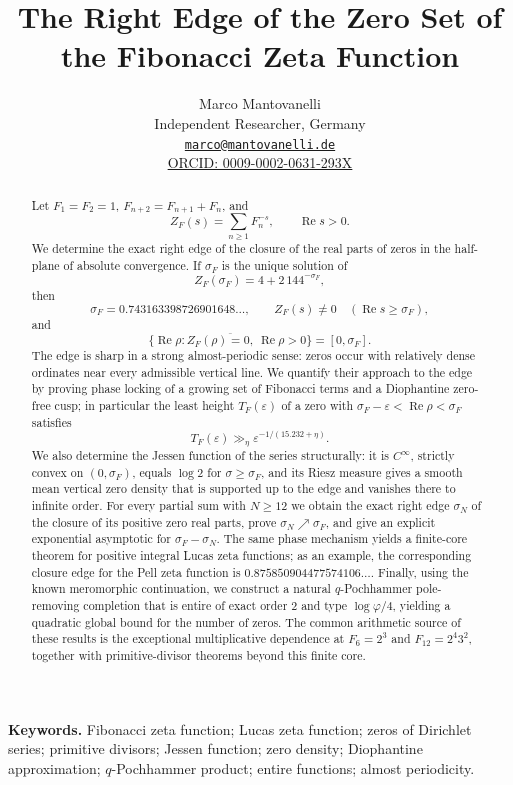 \documentclass[11pt]{article}
\title{\bfseries The Right Edge of the Zero Set of the Fibonacci Zeta Function}
\author{Marco Mantovanelli\\[2pt]
\small Independent Researcher, Germany\\[1pt]
\small \href{mailto:marco@mantovanelli.de}{\texttt{marco@mantovanelli.de}}\\[1pt]
\small \href{https://orcid.org/0009-0002-0631-293X}{ORCID: 0009-0002-0631-293X}}
\date{}
\theoremstyle{remark}
\newcommand{\ZF}{Z_F}
\newcommand{\Ree}{\operatorname{Re}}
\begin{document}
\maketitle

\begin{abstract}
Let $F_1=F_2=1$, $F_{n+2}=F_{n+1}+F_n$, and
\[
\ZF(s)=\sum_{n\ge 1}F_n^{-s},\qquad \Ree s>0.
\]
We determine the exact right edge of the closure of the real parts of zeros in the half-plane of absolute convergence.  If $\sigma_F$ is the unique solution of
\[
\ZF(\sigma_F)=4+2\,144^{-\sigma_F},
\]
then
\[
\sigma_F=0.743163398726901648\ldots,
\qquad
\ZF(s)\neq0\quad(\Ree s\ge\sigma_F),
\]
and
\[
\overline{\{\Ree\rho:\ZF(\rho)=0,\ \Ree\rho>0\}}=[0,\sigma_F].
\]
The edge is sharp in a strong almost-periodic sense: zeros occur with relatively dense ordinates near every admissible vertical line.  We quantify their approach to the edge by proving phase locking of a growing set of Fibonacci terms and a Diophantine zero-free cusp; in particular the least height $T_F(\varepsilon)$ of a zero with $\sigma_F-\varepsilon<\Ree\rho<\sigma_F$ satisfies
\[
T_F(\varepsilon)\gg_\eta \varepsilon^{-1/(15.232+\eta)}.
\]
We also determine the Jessen function of the series structurally: it is $C^\infty$, strictly convex on $(0,\sigma_F)$, equals $\log2$ for $\sigma\ge\sigma_F$, and its Riesz measure gives a smooth mean vertical zero density that is supported up to the edge and vanishes there to infinite order.  For every partial sum with $N\ge12$ we obtain the exact right edge $\sigma_N$ of the closure of its positive zero real parts, prove $\sigma_N\nearrow\sigma_F$, and give an explicit exponential asymptotic for $\sigma_F-\sigma_N$.  The same phase mechanism yields a finite-core theorem for positive integral Lucas zeta functions; as an example, the corresponding closure edge for the Pell zeta function is $0.875850904477574106\ldots$.  Finally, using the known meromorphic continuation, we construct a natural $q$-Pochhammer pole-removing completion that is entire of exact order $2$ and type $\log\varphi/4$, yielding a quadratic global bound for the number of zeros.  The common arithmetic source of these results is the exceptional multiplicative dependence at $F_6=2^3$ and $F_{12}=2^4 3^2$, together with primitive-divisor theorems beyond this finite core.
\end{abstract}

\medskip
\noindent\textbf{Keywords.} Fibonacci zeta function; Lucas zeta function; zeros of Dirichlet series; primitive divisors; Jessen function; zero density; Diophantine approximation; $q$-Pochhammer product; entire functions; almost periodicity.
\end{document}

